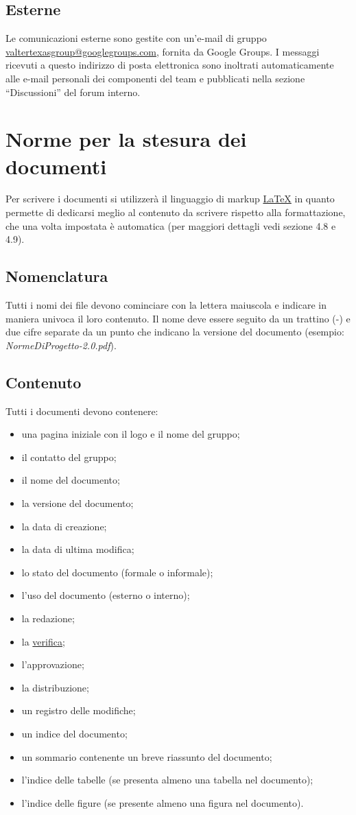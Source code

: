 \section{Esterne}
Le comunicazioni esterne sono gestite con un'e-mail di gruppo
\url{valtertexasgroup@googlegroups.com}, fornita da Google Groups. I messaggi
ricevuti a questo indirizzo di posta elettronica sono inoltrati automaticamente alle e-mail personali dei componenti del team e pubblicati nella
sezione ``Discussioni'' del forum interno.


\chapter{Norme per la stesura dei documenti}
\thispagestyle{fancy}
Per scrivere i documenti si utilizzer\`a il linguaggio di markup
\underline{LaTeX} in quanto permette di dedicarsi meglio al contenuto da
scrivere rispetto alla formattazione, che una volta impostata \`e automatica (per maggiori dettagli
vedi sezione 4.8 e 4.9).

\section{Nomenclatura}
Tutti i nomi dei file devono cominciare con la lettera maiuscola e
indicare in maniera univoca il loro contenuto. Il nome deve essere seguito da un
trattino (-) e due cifre separate da un punto che indicano la versione del
documento (esempio: \emph{NormeDiProgetto-2.0.pdf}).

\section{Contenuto}
Tutti i documenti devono contenere: 
\begin{itemize}
\item {una pagina iniziale con il logo e il nome del gruppo;}
\item {il contatto del gruppo;}
\item {il nome del documento;}
\item {la versione del documento;}
\item {la data di creazione;}
\item {la data di ultima modifica;}
\item {lo stato del documento (formale o informale);}
\item {l'uso del documento (esterno o interno);}
\item {la redazione;}
\item {la \underline{verifica};}
\item {l'approvazione;}
\item {la distribuzione;}
\item {un registro delle modifiche;}
\item {un indice del documento;}
\item {un sommario contenente un breve riassunto del documento;}
\item {l'indice delle tabelle (se presenta almeno una tabella nel documento);}
\item {l'indice delle figure (se presente almeno una figura nel documento).}
\end{itemize} 

